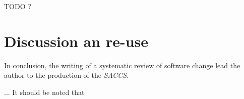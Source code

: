 \documentclass[12pt]{article}
\begin{document}
TODO ?
\section{Discussion an re-use}
In conclusion, the writing of a systematic review of software change lead the author to the production of the \textit{SACCS}.

...
It should be noted that  
\end{document}
